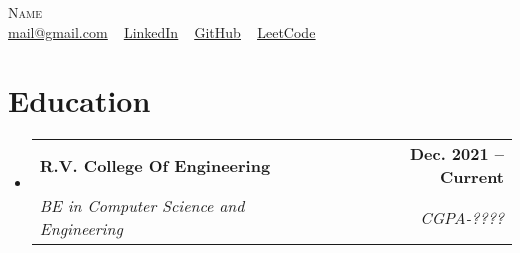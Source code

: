 \documentclass[letterpaper,11pt]{article}
\makeatletter
\newcommand{\resumeSubheading}[4]{
  \vspace{-2pt}\item
    \begin{tabular*}{1.0\textwidth}[t]{l@{\extracolsep{\fill}}r}
      \textbf{#1} & \textbf{\small #2} \\
      \textit{\small#3} & \textit{\small #4} \\
    \end{tabular*}\vspace{-7pt}
}
\newcommand{\resumeSubHeadingListStart}{\begin{itemize}[leftmargin=0.0in, label={}]}
\newcommand{\resumeSubHeadingListEnd}{\end{itemize}}
\makeatother
\begin{document}
\begin{center}
    {\Huge \scshape Name} \\
    \vspace{10pt}
    \href{mailto:mail@gmail.com}{\underline{mail@gmail.com}} ~ 
    \href{https://www.linkedin.com/in}{\underline{LinkedIn}}  ~
    \href{https://github.com/}{\underline{GitHub}} ~
    \href{https://leetcode.com}{\underline{LeetCode}}
\end{center}






\vspace{-5pt}
\section{Education}
\vspace{5pt}
  \resumeSubHeadingListStart
    \resumeSubheading
      {R.V. College Of Engineering }{Dec. 2021 -- Current}
      {BE in Computer Science and Engineering}{CGPA-????}


  \resumeSubHeadingListEnd

\end{document}
